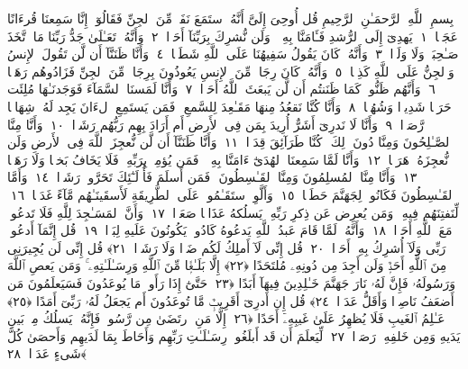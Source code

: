 
  
    
  
    
    

\nopagebreak
  بِسمِ ٱللَّهِ ٱلرَّحمَـٰنِ ٱلرَّحِيمِ
  قُل أُوحِىَ إِلَىَّ أَنَّهُ ٱستَمَعَ نَفَرٌۭ مِّنَ ٱلجِنِّ فَقَالُوٓا۟ إِنَّا سَمِعنَا قُرءَانًا عَجَبًۭا ﴿١﴾
 يَهدِىٓ إِلَى ٱلرُّشدِ فَـَٔامَنَّا بِهِۦ ۖ وَلَن نُّشرِكَ بِرَبِّنَآ أَحَدًۭا ﴿٢﴾
 وَأَنَّهُۥ تَعَـٰلَىٰ جَدُّ رَبِّنَا مَا ٱتَّخَذَ صَـٰحِبَةًۭ وَلَا وَلَدًۭا ﴿٣﴾
 وَأَنَّهُۥ كَانَ يَقُولُ سَفِيهُنَا عَلَى ٱللَّهِ شَطَطًۭا ﴿٤﴾
 وَأَنَّا ظَنَنَّآ أَن لَّن تَقُولَ ٱلإِنسُ وَٱلجِنُّ عَلَى ٱللَّهِ كَذِبًۭا ﴿٥﴾
 وَأَنَّهُۥ كَانَ رِجَالٌۭ مِّنَ ٱلإِنسِ يَعُوذُونَ بِرِجَالٍۢ مِّنَ ٱلجِنِّ فَزَادُوهُم رَهَقًۭا ﴿٦﴾
 وَأَنَّهُم ظَنُّوا۟ كَمَا ظَنَنتُم أَن لَّن يَبعَثَ ٱللَّهُ أَحَدًۭا ﴿٧﴾
 وَأَنَّا لَمَسنَا ٱلسَّمَآءَ فَوَجَدنَـٰهَا مُلِئَت حَرَسًۭا شَدِيدًۭا وَشُهُبًۭا ﴿٨﴾
 وَأَنَّا كُنَّا نَقعُدُ مِنهَا مَقَـٰعِدَ لِلسَّمعِ ۖ فَمَن يَستَمِعِ ٱلءَانَ يَجِد لَهُۥ شِهَابًۭا رَّصَدًۭا ﴿٩﴾
 وَأَنَّا لَا نَدرِىٓ أَشَرٌّ أُرِيدَ بِمَن فِى ٱلأَرضِ أَم أَرَادَ بِهِم رَبُّهُم رَشَدًۭا ﴿١٠﴾
 وَأَنَّا مِنَّا ٱلصَّـٰلِحُونَ وَمِنَّا دُونَ ذَٟلِكَ ۖ كُنَّا طَرَآئِقَ قِدَدًۭا ﴿١١﴾
 وَأَنَّا ظَنَنَّآ أَن لَّن نُّعجِزَ ٱللَّهَ فِى ٱلأَرضِ وَلَن نُّعجِزَهُۥ هَرَبًۭا ﴿١٢﴾
 وَأَنَّا لَمَّا سَمِعنَا ٱلهُدَىٰٓ ءَامَنَّا بِهِۦ ۖ فَمَن يُؤمِنۢ بِرَبِّهِۦ فَلَا يَخَافُ بَخسًۭا وَلَا رَهَقًۭا ﴿١٣﴾
 وَأَنَّا مِنَّا ٱلمُسلِمُونَ وَمِنَّا ٱلقَـٰسِطُونَ ۖ فَمَن أَسلَمَ فَأُو۟لَـٰٓئِكَ تَحَرَّوا۟ رَشَدًۭا ﴿١٤﴾
 وَأَمَّا ٱلقَـٰسِطُونَ فَكَانُوا۟ لِجَهَنَّمَ حَطَبًۭا ﴿١٥﴾
 وَأَلَّوِ ٱستَقَـٰمُوا۟ عَلَى ٱلطَّرِيقَةِ لَأَسقَينَـٰهُم مَّآءً غَدَقًۭا ﴿١٦﴾
 لِّنَفتِنَهُم فِيهِ ۚ وَمَن يُعرِض عَن ذِكرِ رَبِّهِۦ يَسلُكهُ عَذَابًۭا صَعَدًۭا ﴿١٧﴾
 وَأَنَّ ٱلمَسَـٰجِدَ لِلَّهِ فَلَا تَدعُوا۟ مَعَ ٱللَّهِ أَحَدًۭا ﴿١٨﴾
 وَأَنَّهُۥ لَمَّا قَامَ عَبدُ ٱللَّهِ يَدعُوهُ كَادُوا۟ يَكُونُونَ عَلَيهِ لِبَدًۭا ﴿١٩﴾
 قُل إِنَّمَآ أَدعُوا۟ رَبِّى وَلَآ أُشرِكُ بِهِۦٓ أَحَدًۭا ﴿٢٠﴾
 قُل إِنِّى لَآ أَملِكُ لَكُم ضَرًّۭا وَلَا رَشَدًۭا ﴿٢١﴾
 قُل إِنِّى لَن يُجِيرَنِى مِنَ ٱللَّهِ أَحَدٌۭ وَلَن أَجِدَ مِن دُونِهِۦ مُلتَحَدًا ﴿٢٢﴾
 إِلَّا بَلَـٰغًۭا مِّنَ ٱللَّهِ وَرِسَـٰلَـٰتِهِۦ ۚ وَمَن يَعصِ ٱللَّهَ وَرَسُولَهُۥ فَإِنَّ لَهُۥ نَارَ جَهَنَّمَ خَـٰلِدِينَ فِيهَآ أَبَدًا ﴿٢٣﴾
 حَتَّىٰٓ إِذَا رَأَوا۟ مَا يُوعَدُونَ فَسَيَعلَمُونَ مَن أَضعَفُ نَاصِرًۭا وَأَقَلُّ عَدَدًۭا ﴿٢٤﴾
 قُل إِن أَدرِىٓ أَقَرِيبٌۭ مَّا تُوعَدُونَ أَم يَجعَلُ لَهُۥ رَبِّىٓ أَمَدًا ﴿٢٥﴾
 عَـٰلِمُ ٱلغَيبِ فَلَا يُظهِرُ عَلَىٰ غَيبِهِۦٓ أَحَدًا ﴿٢٦﴾
 إِلَّا مَنِ ٱرتَضَىٰ مِن رَّسُولٍۢ فَإِنَّهُۥ يَسلُكُ مِنۢ بَينِ يَدَيهِ وَمِن خَلفِهِۦ رَصَدًۭا ﴿٢٧﴾
 لِّيَعلَمَ أَن قَد أَبلَغُوا۟ رِسَـٰلَـٰتِ رَبِّهِم وَأَحَاطَ بِمَا لَدَيهِم وَأَحصَىٰ كُلَّ شَىءٍ عَدَدًۢا ﴿٢٨﴾
 
